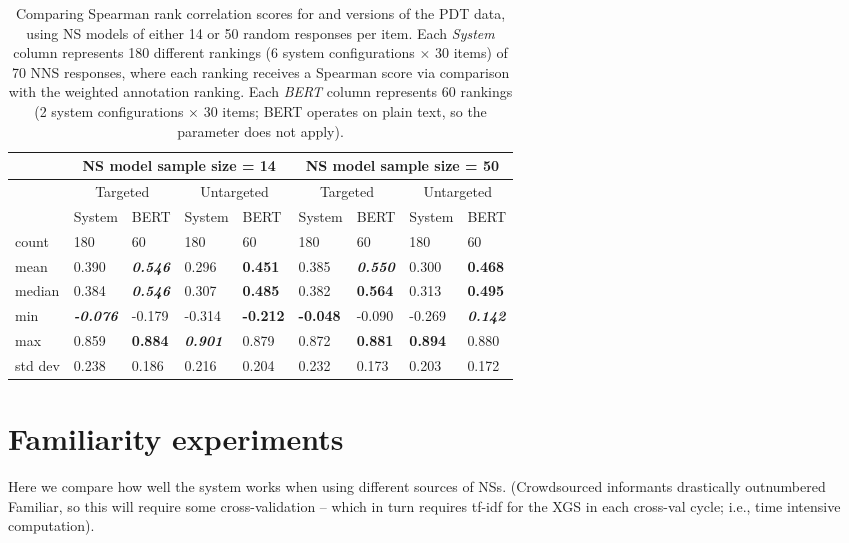 \begin{table}[htb!]
\begin{center}
\begin{tabular}{|l||l|l||l|l||l|l||l|l|}
\hline
& \multicolumn{4}{c||}{NS model sample size = 14} & \multicolumn{4}{c|}{NS model sample size = 50} \\
\hline
 & \multicolumn{2}{c||}{Targeted} & \multicolumn{2}{c||}{Untargeted} & \multicolumn{2}{c||}{Targeted} & \multicolumn{2}{c|}{Untargeted} \\
\hline
	& System 		& BERT 		& System 	& BERT 		& System 	& BERT 		& System 	& BERT \\
\hline
count 	& 180 		& 60 		& 180 		& 60 		& 180 		& 60 		& 180 		& 60 \\
\hline
mean 	& 0.390 	& \textit{\textbf{0.546}} 	& 0.296 	& \textbf{0.451} 	& 0.385 	& \textit{\textbf{0.550}} 	& 0.300 	& \textbf{0.468}  \\
\hline
median 	& 0.384 	& \textit{\textbf{0.546}} 	& 0.307 	& \textbf{0.485} 	& 0.382 	& \textbf{\textbf{0.564}} 	& 0.313		& \textbf{0.495} \\
\hline
min 	& \textit{\textbf{-0.076}} 	& -0.179 	& -0.314 	& \textbf{-0.212} 	& \textbf{-0.048} 	& -0.090	& -0.269 	& \textit{\textbf{0.142}} \\
\hline
max 	& 0.859 	& \textbf{0.884} 	& \textit{\textbf{0.901}}		& 0.879 	& 0.872 	& \textbf{0.881}		& \textbf{0.894} 	& 0.880 \\
\hline
std dev 	& 0.238 	& 0.186 	& 0.216 	& 0.204 	& 0.232 	& 0.173		& 0.203 	& 0.172 \\
\hline
\end{tabular}
\caption{\label{tab:targeting-results} Comparing Spearman rank correlation scores for  and  versions of the PDT data, using NS models of either 14 or 50 random responses per item. Each \textit{System} column represents 180 different rankings (6 system configurations $\times$ 30 items) of 70 NNS responses, where each ranking receives a Spearman score via comparison with the weighted annotation ranking. Each \textit{BERT} column represents 60 rankings (2 system configurations $\times$ 30 items; BERT operates on plain text, so the  parameter does not apply).}
\end{center}
\end{table}


\section{Familiarity experiments}
\label{sec:exp-familiarity}
Here we compare how well the system works when using different sources of NSs. (Crowdsourced informants drastically outnumbered Familiar, so this will require some cross-validation -- which in turn requires tf-idf for the XGS in each cross-val cycle; i.e., time intensive computation).

